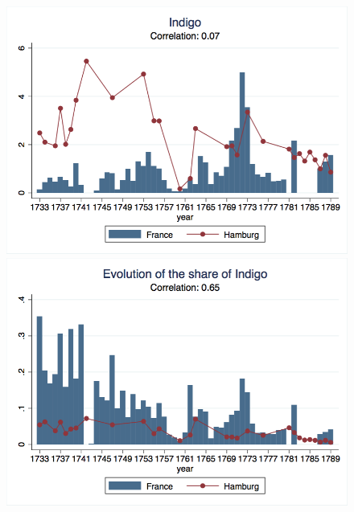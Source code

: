 \documentclass[12pt,a4paper,titlepage,english]{article}
\begin{document}
\begin{figure}
\includegraphics[scale=.28]{indigo_long.png}
\includegraphics[scale=.28]{indigo_share_long.png}\\
\end{figure}
\end{document}
